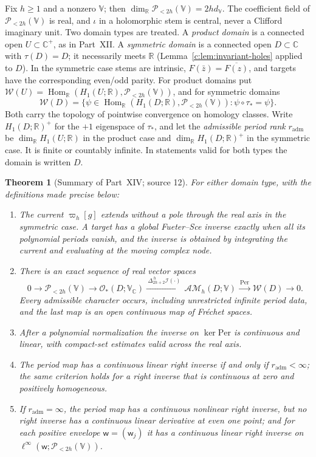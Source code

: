 \documentclass[11pt,a4paper]{article}
\numberwithin{equation}{section}
\newtheorem{theorem}{Theorem}[section]
\theoremstyle{definition}
\theoremstyle{remark}
\theoremstyle{plain}
\newcommand{\RR}{\mathbb R}
\newcommand{\CC}{\mathbb C}
\newcommand{\Cplus}{\CC^{+}}
\newcommand{\I}{\mathcal I}
\newcommand{\AM}{\mathcal{AM}}
\newcommand{\Per}{\mathrm{Per}}
\newcommand{\lapH}{\Delta_{2h+2}^{\,h}}
\newcommand{\VV}{\mathbb V}                       %
\newcommand{\VC}{\mathbb V_{\CC}}                 %
\newcommand{\dV}{d_{\VV}}                         %
\newcommand{\PolH}{\mathscr P_{<2h}(\VV)}
\newcommand{\cur}{\varpi}                         %
\begin{document}
Fix $h\ge1$ and a nonzero $\VV$; then $\dim_\RR\PolH=2h\dV$. The coefficient
field of $\PolH$ is real, and $\iota$ in a holomorphic stem is central, never
a Clifford imaginary unit. Two domain types are treated. A \emph{product
domain} is a connected open $U\subset\Cplus$, as in Part~XII. A
\emph{symmetric domain} is a connected open $D\subset\CC$ with $\tau(D)=D$;
it necessarily meets $\RR$ (Lemma~\ref{c:lem:invariant-holes} applied to $D$).
In the symmetric case stems are intrinsic, $F(\bar z)=\overline{F(z)}$, and
targets have the corresponding even/odd parity. For product domains put
$\mathscr W(U)=\operatorname{Hom}_\RR(H_1(U;\RR),\PolH)$, and for symmetric
domains
\begin{equation}\label{h:eq:intro-W}
 \mathscr W(D)=\bigl\{\psi\in\operatorname{Hom}_\RR(H_1(D;\RR),\PolH):
 \psi\circ\tau_*=\psi\bigr\}.
\end{equation}
Both carry the topology of pointwise convergence on homology classes. Write
$H_1(D;\RR)^+$ for the $+1$ eigenspace of $\tau_*$, and let the
\emph{admissible period rank} $r_{\mathrm{adm}}$ be $\dim_\RR H_1(U;\RR)$ in the
product case and $\dim_\RR H_1(D;\RR)^+$ in the symmetric case. It is finite or
countably infinite. In statements valid for both types the domain is written
$D$.

\begin{theorem}[Summary of Part~XIV; source 12]
\label{h:thm:main}
For either domain type, with the definitions made precise below:
\begin{enumerate}[label=\textup{(\roman*)}]
\item The current $\cur_h[g]$ extends without a pole through the real axis in
the symmetric case. A target has a global Fueter--Sce inverse exactly when all
its polynomial periods vanish, and the inverse is obtained by integrating the
current and evaluating at the moving complex node.
\item There is an exact sequence of real vector spaces
\begin{equation}\label{h:eq:intro-exact}
 0\longrightarrow\PolH\longrightarrow\mathcal O_*(D;\VC)
 \xrightarrow{\ \lapH\I(\cdot)\ }\AM_h(D;\VV)
 \xrightarrow{\ \Per\ }\mathscr W(D)\longrightarrow0 .
\end{equation}
Every admissible character occurs, including unrestricted infinite period
data, and the last map is an open continuous map of Fr\'echet spaces.
\item After a polynomial normalization the inverse on $\ker\Per$ is continuous
and linear, with compact-set estimates valid across the real axis.
\item The period map has a continuous linear right inverse if and only if
$r_{\mathrm{adm}}<\infty$; the same criterion holds for a right inverse that is
continuous at zero and positively homogeneous.
\item If $r_{\mathrm{adm}}=\infty$, the period map has a continuous nonlinear
right inverse, but no right inverse has a continuous linear derivative at even
one point; and for each positive envelope $\mathsf w=(\mathsf w_j)$ it has a
continuous linear right inverse on $\ell^\infty(\mathsf w;\PolH)$.
\end{enumerate}
\end{theorem}
\end{document}
